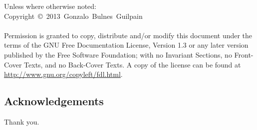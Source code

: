 \begin{frame}{\insertsubsection}
    \scriptsize{Unless where otherwise noted:}\\
    \noindent\scriptsize{Copyright~\copyright~2013~Gonzalo~Bulnes~Guilpain}\\~\\

    \scriptsize{Permission is granted to copy, distribute and/or modify this document
    under the terms of the GNU Free Documentation License, Version 1.3
    or any later version published by the Free Software Foundation;
    with no Invariant Sections, no Front-Cover Texts, and no Back-Cover Texts.
    A copy of the license can be found at \url{http://www.gnu.org/copyleft/fdl.html}.}
  \end{frame}

%
\subsection{Acknowledgements}

  \begin{frame}
    \vspace{0mm}
    \begin{center}
      Thank you.
    \end{center}
  \end{frame}
